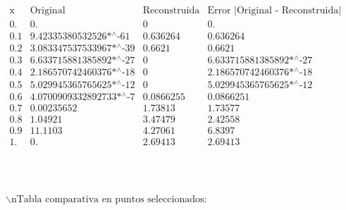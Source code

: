 \documentclass{article}
\begin{document}
\noindent\(\begin{array}{cccc}
 \text{x} & \text{Original} & \text{Reconstruida} & \text{Error $|$Original - Reconstruida$|$} \\
 0. & 0. & 0 & 0. \\
 0.1 & \text{9.42335380532526$\grave{ }$*${}^{\wedge}$-61} & 0.636264 & 0.636264 \\
 0.2 & \text{3.083347537533967$\grave{ }$*${}^{\wedge}$-39} & 0.6621 & 0.6621 \\
 0.3 & \text{6.633715881385892$\grave{ }$*${}^{\wedge}$-27} & 0 & \text{6.633715881385892$\grave{ }$*${}^{\wedge}$-27} \\
 0.4 & \text{2.186570742460376$\grave{ }$*${}^{\wedge}$-18} & 0 & \text{2.186570742460376$\grave{ }$*${}^{\wedge}$-18} \\
 0.5 & \text{5.029945365765625$\grave{ }$*${}^{\wedge}$-12} & 0 & \text{5.029945365765625$\grave{ }$*${}^{\wedge}$-12} \\
 0.6 & \text{4.0700909332892733$\grave{ }$*${}^{\wedge}$-7} & 0.0866255 & 0.0866251 \\
 0.7 & 0.00235652 & 1.73813 & 1.73577 \\
 0.8 & 1.04921 & 3.47479 & 2.42558 \\
 0.9 & 11.1103 & 4.27061 & 6.8397 \\
 1. & 0. & 2.69413 & 2.69413 \\
\end{array}\)

\noindent\(\begin{array}{cc}
 
\begin{array}{cc}
  &  \\
\end{array}
 &  \\
\end{array}\)

\noindent\(\text{$\backslash $nTabla comparativa en puntos seleccionados:}\)
\end{document}
